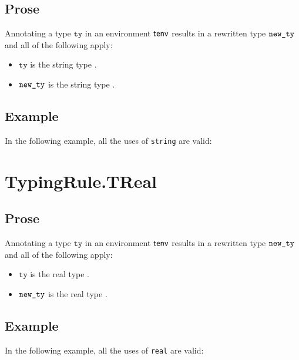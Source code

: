 \documentclass{book}
\newcommand\tty[0]{\texttt{ty}}
\begin{document}
\subsection{Prose}
Annotating a type $\tty$ in an environment $\textsf{tenv}$ results in a
rewritten type $\texttt{new\_ty}$ and all of the following apply:
\begin{itemize}
  \item $\tty$ is the string type \TString.
  \item $\texttt{new\_ty}$ is the string type \TString.
\end{itemize}

\subsection{Example}
In the following example, all the uses of \texttt{string} are valid:





\section{TypingRule.TReal \label{sec:TypingRule.TReal}}

\subsection{Prose}
Annotating a type $\tty$ in an environment $\textsf{tenv}$ results in a
rewritten type $\texttt{new\_ty}$ and all of the following apply:
\begin{itemize}
  \item $\tty$ is the real type \TReal.
  \item $\texttt{new\_ty}$ is the real type \TReal.
\end{itemize}


\subsection{Example}
In the following example, all the uses of \texttt{real} are valid:



\end{document}
